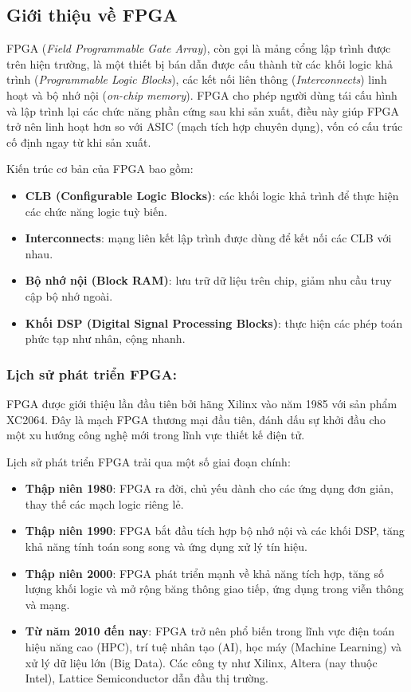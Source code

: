 \documentclass[a4paper]{article}
\begin{document}
\subsection{Giới thiệu về FPGA}
FPGA (\textit{Field Programmable Gate Array}), còn gọi là mảng cổng lập trình được trên hiện trường, là một thiết bị bán dẫn được cấu thành từ các khối logic khả trình (\textit{Programmable Logic Blocks}), các kết nối liên thông (\textit{Interconnects}) linh hoạt và bộ nhớ nội (\textit{on-chip memory}). FPGA cho phép người dùng tái cấu hình và lập trình lại các chức năng phần cứng sau khi sản xuất, điều này giúp FPGA trở nên linh hoạt hơn so với ASIC (mạch tích hợp chuyên dụng), vốn có cấu trúc cố định ngay từ khi sản xuất.

Kiến trúc cơ bản của FPGA bao gồm:
\begin{itemize} [label=-]
    \item \textbf{CLB (Configurable Logic Blocks)}: các khối logic khả trình để thực hiện các chức năng logic tuỳ biến.
    \item \textbf{Interconnects}: mạng liên kết lập trình được dùng để kết nối các CLB với nhau.
    \item \textbf{Bộ nhớ nội (Block RAM)}: lưu trữ dữ liệu trên chip, giảm nhu cầu truy cập bộ nhớ ngoài.
    \item \textbf{Khối DSP (Digital Signal Processing Blocks)}: thực hiện các phép toán phức tạp như nhân, cộng nhanh.
\end{itemize}

\subsubsection{Lịch sử phát triển FPGA:} FPGA được giới thiệu lần đầu tiên bởi hãng Xilinx vào năm 1985 với sản phẩm XC2064. Đây là mạch FPGA thương mại đầu tiên, đánh dấu sự khởi đầu cho một xu hướng công nghệ mới trong lĩnh vực thiết kế điện tử. 

Lịch sử phát triển FPGA trải qua một số giai đoạn chính:
\begin{itemize} [label=-]
    \item \textbf{Thập niên 1980}: FPGA ra đời, chủ yếu dành cho các ứng dụng đơn giản, thay thế các mạch logic riêng lẻ.
    \item \textbf{Thập niên 1990}: FPGA bắt đầu tích hợp bộ nhớ nội và các khối DSP, tăng khả năng tính toán song song và ứng dụng xử lý tín hiệu.
    \item \textbf{Thập niên 2000}: FPGA phát triển mạnh về khả năng tích hợp, tăng số lượng khối logic và mở rộng băng thông giao tiếp, ứng dụng trong viễn thông và mạng.
    \item \textbf{Từ năm 2010 đến nay}: FPGA trở nên phổ biến trong lĩnh vực điện toán hiệu năng cao (HPC), trí tuệ nhân tạo (AI), học máy (Machine Learning) và xử lý dữ liệu lớn (Big Data). Các công ty như Xilinx, Altera (nay thuộc Intel), Lattice Semiconductor dẫn đầu thị trường.
\end{itemize}
\end{document}
